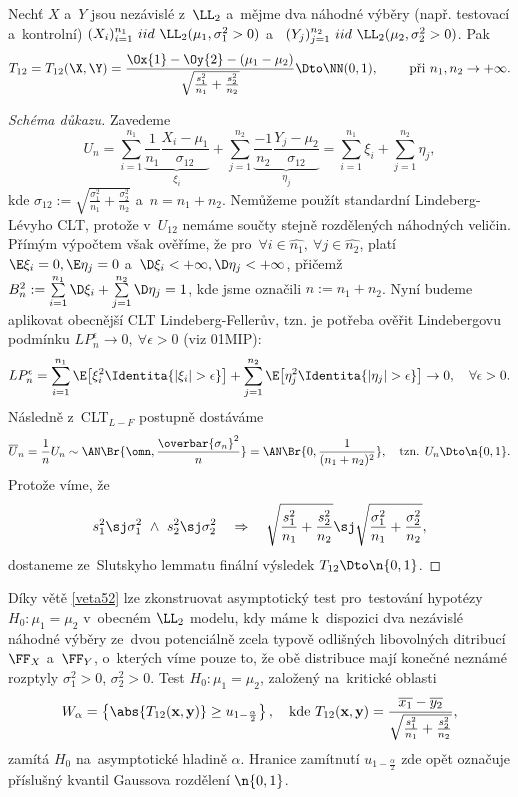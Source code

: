 \begin{theorem}\label{veta52}
	Nechť $X$ a~$Y$ jsou nezávislé z~$\LL_2$ a~mějme dva náhodné výběry (např. testovací a~kontrolní) $(X_i)_{i=1}^{n_1}~iid~\LL_2(\mu_1,\sigma_1^2>0)$ a~ $(Y_j)_{j=1}^{n_2}~iid~\LL_2(\mu_2,\sigma_2^2>0)$. Pak 
	$$ T_{12}=T_{12}(\X,\Y)=\frac{\Ox{1}-\Oy{2}-(\mu_1-\mu_2)}{\sqrt{\frac{s_1^2}{n_1}+\frac{s_2^2}{n_2}}}\Dto \NN(0,1),\qquad\text{ při~}n_1,n_2\to+\infty. $$
	\begin{proof}[Schéma důkazu] Zavedeme
		$$ U_{n}=\sum\limits_{i=1}^{n_1}\underbrace{\frac{1}{n_1}\frac{X_i-\mu_1}{\sigma_{12}}}_{\xi_i}+\sum\limits_{j=1}^{n_2}\underbrace{\frac{-1}{n_2}\frac{Y_j-\mu_2}{\sigma_{12}}}_{\eta_j}=\sum\limits_{i=1}^{n_1}\xi_i+\sum\limits_{j=1}^{n_2}\eta_j, $$ kde $\sigma_{12}:=\sqrt{\frac{\sigma_1^2}{n_1}+\frac{\sigma_2^2}{n_2}}$ a~$n=n_1+n_2$. Nemůžeme použít standardní Lindeberg-Lévyho CLT, protože v~$U_{12}$ nemáme součty stejně rozdělených náhodných veličin. Přímým výpočtem však ověříme, že pro~$\forall i\in\widehat{n_1},~\forall j\in\widehat{n_2}$, platí\\
		 $\E\xi_i=0,\E\eta_j=0$ a~$\D\xi_i<+\infty,\D\eta_j<+\infty$, přičemž $B_n^2:=\sum\limits_{i=1}^{n_1}\D\xi_i+\sum\limits_{j=1}^{n_2}\D\eta_j=1$, kde jsme označili $n:=n_1+n_2$. Nyní budeme aplikovat obecnější CLT Lindeberg-Fellerův, tzn. je potřeba ověřit Lindebergovu podmínku $LP_n^\epsilon\to0,~\forall\epsilon>0$ (viz 01MIP):
		$$ LP_n^\epsilon=\sum\limits_{i=1}^{n_1}\E\big[ \xi_i^2 \Identita{|\xi_i|>\epsilon}\big] +\sum\limits_{j=1}^{n_2}\E\big[ \eta_j^2 \Identita{|\eta_j|>\epsilon} \big] \to0,\quad \forall\epsilon>0. $$ Následně z~CLT$_{L-F}$ postupně dostáváme 
		$$
		\overline{U}_{n}=\frac{1}{n}U_{n}\sim \AN\Br{\omn,\frac{\overbar{\rule{0ex}{1.2ex}\sigma_n}^2}{n}}=\AN\Br{0,\frac{1}{(n_1+n_2)^2}},\quad\text{tzn. }U_{n}\Dto\n{0,1}. $$
		Protože víme, že 
		$$ s_1^2\sj \sigma_1^2~\wedge~s_2^2\sj \sigma_2^2~~~\Rightarrow~~~ \sqrt{\frac{s_1^2}{n_1}+\frac{s_2^2}{n_2}}\sj \sqrt{\frac{\sigma_1^2}{n_1}+\frac{\sigma_2^2}{n_2}} ,$$
		dostaneme ze~Slutskyho lemmatu finální výsledek $T_{12}\Dto\n{0,1}$.
	\end{proof}
\end{theorem}

\begin{dusl}[Dvouvýběrový asymptotický test $\mu_1=\mu_2$]
	Díky větě \ref{veta52} lze zkonstruovat asymptotický test pro~testování hypotézy $H_0:\mu_1=\mu_2$ v~obecném $\LL_2$ modelu, kdy máme k~dispozici dva nezávislé náhodné výběry ze~dvou potenciálně zcela typově odlišných libovolných ditribucí $\FF_X$ a~$\FF_Y$, o~kterých víme pouze to, že obě distribuce mají konečné neznámé rozptyly $\sigma_1^2>0$, $\sigma_2^2>0$. Test $H_0:\mu_1=\mu_2$, založený na~kritické oblasti 
	$$ W_\alpha=\left\{ \abs{T_{12}(\textbf{x},\textbf{y})}\geq u_{1-\frac{\alpha}{2}} \right\},\quad\text{kde }T_{12}(\textbf{x},\textbf{y})=\frac{\overline{x_1}-\overline{y_2}}{\sqrt{\frac{s_1^2}{n_1}+\frac{s_2^2}{n_2}}}, $$
	zamítá $H_0$ na~asymptotické hladině $\alpha$. Hranice zamítnutí $u_{1-\frac{\alpha}{2}}$ zde opět označuje příslušný kvantil Gaussova rozdělení $\n{0,1}$.
	
\end{dusl}
